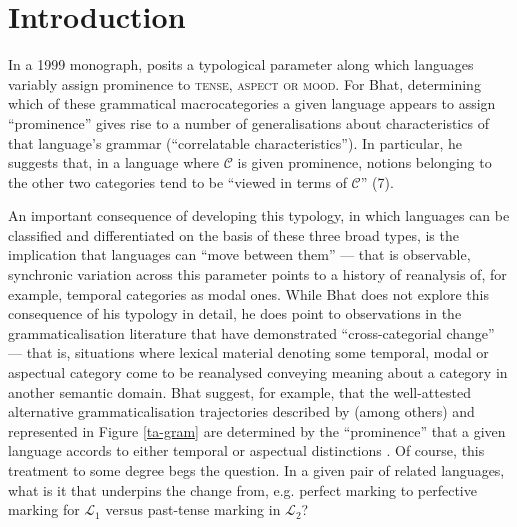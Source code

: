 
\chapter{Introduction}

In a 1999 monograph, \citeauthor{Bhat1999} posits a typological parameter along which languages variably assign prominence to \textsc{tense, aspect \textup{or} mood}. For Bhat, determining which of these grammatical macrocategories a given language appears to assign ``prominence'' gives rise to a number of generalisations about characteristics of that language's grammar (``correlatable characteristics''). In particular, he suggests that, in a language where $ \mathcal C $ is given prominence, notions belonging to the other two categories tend to be ``viewed in terms of $ \mathcal C $'' (7).


An important consequence of developing this typology, in which languages can be classified and differentiated on the basis of these three broad types, is the implication that languages can ``move between them'' --- that is observable, synchronic variation across this parameter points to a history of reanalysis of, for example, temporal categories as modal ones. While Bhat does not explore this consequence of his typology in detail, he does point to observations in the grammaticalisation literature that have demonstrated ``cross-categorial change'' --- that is, situations where lexical material denoting some temporal, modal or aspectual category come to be reanalysed conveying meaning about a category in another semantic domain. Bhat suggest, for example, that the well-attested alternative grammaticalisation trajectories described by \cite{Bybee1994} (among others) and represented in Figure \ref{ta-gram} are determined by the ``prominence'' that a given language accords to either temporal or aspectual distinctions \citeyearpar[182]{Bhat1999}. Of course, this treatment to some degree begs the question. In a given pair of related languages, what is it that underpins the change from, e.g. perfect marking to perfective marking for $ \mathcal L_1 $ versus past-tense marking in $ \mathcal{L}_2 $?

